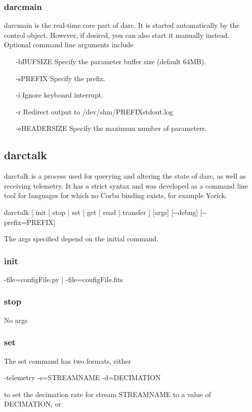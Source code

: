 \documentclass[a4,10pt]{article}
\begin{document}
\subsubsection{darcmain}
darcmain is the real-time core part of darc.  It is started
automatically by the control object.  However, if desired, you can
also start it manually instead.  Optional command line arguments include
\begin{itemize}
\item[-bBUFSIZE] Specify the parameter buffer size (default 64MB).
\item[-sPREFIX] Specify the prefix.
\item[-i] Ignore keyboard interrupt.
\item[-r] Redirect output to /dev/shm/PREFIXstdout.log
\item[-eHEADERSIZE] Specify the maximum number of parameters.
\end{itemize}

\subsection{darctalk}
darctalk is a process used for querying and altering the state of
darc, as well as receiving telemetry.  It has a strict syntax and was
developed as a command line tool for languages for which no Corba
binding exists, for example Yorick.

darctalk [ init | stop | set | get | read | transfer ] [args] [-{-}debug] [-{-}prefix=PREFIX]

The args specified depend on the initial command.

\subsubsection{init}
-file=configFile.py | -file=configFile.fits

\subsubsection{stop}
No args

\subsubsection{set}
The set command has two formats, either

-telemetry -s=STREAMNAME -d=DECIMATION

to set the decimation rate for stream STREAMNAME to a value of DECIMATION,
or
\end{document}
